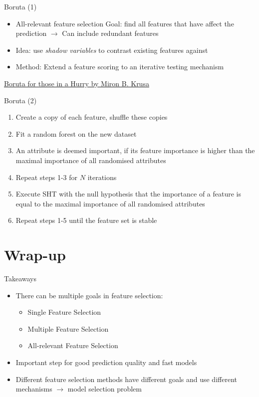 \documentclass[11pt,compress,t,notes=noshow, aspectratio=169, xcolor=table]{beamer}
\begin{document}
\begin{frame}{Boruta (1)}
    \begin{itemize}
        \item All-relevant feature selection
        \newline Goal: find all features that have affect the prediction
        \newline $\rightarrow$ Can include redundant features
        \item Idea: use \emph{shadow variables} to contrast existing features against
        \item Method: Extend a feature scoring to an iterative testing mechanism
    \end{itemize}
    \vfill
    \href{https://cran.r-project.org/web/packages/Boruta/vignettes/inahurry.pdf}{Boruta for those in a Hurry by Miron B. Krusa}
\end{frame}

\begin{frame}{Boruta (2)}
    \vfill
    \begin{enumerate}
        \item Create a copy of each feature, shuffle these copies
        \item Fit a random forest on the new dataset
        \item An attribute is deemed important, if its feature importance is higher than the maximal importance of all randomised attributes
        \item Repeat steps 1-3 for $N$ iterations
        \item Execute SHT with the null hypothesis that the importance of a feature is equal to the maximal importance of all randomised attributes
        \item Repeat steps 1-5 until the feature set is stable
    \end{enumerate}
    \vfill
\end{frame}

\section{Wrap-up}

\begin{frame}{Takeaways}
    \vfill
    \begin{itemize}
        \item There can be multiple goals in feature selection:
        \begin{itemize}
            \item Single Feature Selection
            \item Multiple Feature Selection
            \item All-relevant Feature Selection
        \end{itemize}
        \item Important step for good prediction quality and fast models
        \item Different feature selection methods have different goals and use different mechanisms $\rightarrow$ model selection problem
    \end{itemize}
    \vfill
\end{frame}

\endlecture
\end{document}

